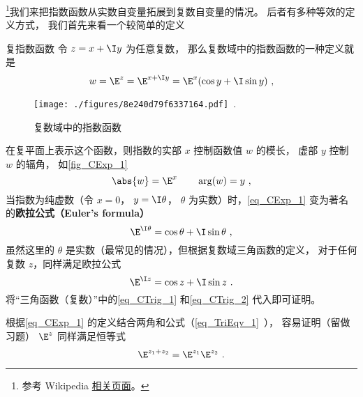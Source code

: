 
\begin{issues}
\issueTODO
\end{issues}



\footnote{参考 Wikipedia \href{https://en.wikipedia.org/wiki/Euler's_formula}{相关页面}。}我们来把指数函数从实数自变量拓展到复数自变量的情况。 后者有多种等效的定义方式， 我们首先来看一个较简单的定义

\begin{definition}{复指数函数}
令 $z = x + \I y$ 为任意复数， 那么复数域中的指数函数的一种定义就是
\begin{equation}\label{eq_CExp_1}
w = \E^z = \E^{x + \I y} = \E^x(\cos y + \I\sin y)~,
\end{equation}
\end{definition}

\begin{figure}[ht]
\centering
\texttt{[image: ./figures/8e240d79f6337164.pdf]}~.
\caption{复数域中的指数函数} \label{fig_CExp_1}
\end{figure}

在复平面上表示这个函数，则指数的实部 $x$ 控制函数值 $w$ 的模长， 虚部 $y$ 控制 $w$ 的辐角， 如\autoref{fig_CExp_1}
 \begin{equation}
\abs{w} = \E^x \qquad \arg(w) = y~,
\end{equation}
当指数为纯虚数（令 $x = 0$， $y = \I\theta$， $\theta$ 为实数）时，\autoref{eq_CExp_1} 变为著名的\textbf{欧拉公式（Euler's formula）}
\begin{equation}\label{eq_CExp_2}
\E^{\I \theta} = \cos \theta + \I\sin \theta~,
\end{equation}
虽然这里的 $\theta$ 是实数（最常见的情况），但根据复数域三角函数的定义， 对于任何复数 $z$，同样满足欧拉公式
\begin{equation}
\E^{\I z} = \cos z + \I\sin z~.
\end{equation}
将“三角函数（复数）”中的\autoref{eq_CTrig_1} 和\autoref{eq_CTrig_2} 代入即可证明。

根据\autoref{eq_CExp_1} 的定义结合两角和公式（\autoref{eq_TriEqv_1}~）， 容易证明（留做习题） $\E^z$ 同样满足恒等式
\begin{equation}
\E^{z_1 + z_2} = \E^{z_1}\E^{z_2}~.
\end{equation}

